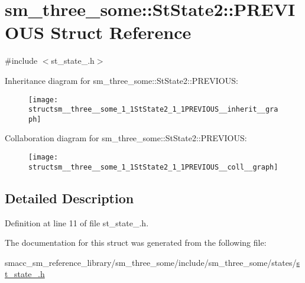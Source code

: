 \hypertarget{structsm__three__some_1_1StState2_1_1PREVIOUS}{}\section{sm\+\_\+three\+\_\+some\+:\+:St\+State2\+:\+:P\+R\+E\+V\+I\+O\+US Struct Reference}
\label{structsm__three__some_1_1StState2_1_1PREVIOUS}


{\ttfamily \#include $<$st\+\_\+state\+\_.\+h$>$}



Inheritance diagram for sm\+\_\+three\+\_\+some\+:\+:St\+State2\+:\+:P\+R\+E\+V\+I\+O\+US\+:
\nopagebreak
\begin{figure}[H]
\begin{center}
\leavevmode
\texttt{[image: structsm\_\_three\_\_some\_1\_1StState2\_1\_1PREVIOUS\_\_inherit\_\_graph]}
\end{center}
\end{figure}


Collaboration diagram for sm\+\_\+three\+\_\+some\+:\+:St\+State2\+:\+:P\+R\+E\+V\+I\+O\+US\+:
\nopagebreak
\begin{figure}[H]
\begin{center}
\leavevmode
\texttt{[image: structsm\_\_three\_\_some\_1\_1StState2\_1\_1PREVIOUS\_\_coll\_\_graph]}
\end{center}
\end{figure}


\subsection{Detailed Description}


Definition at line 11 of file st\+\_\+state\+\_.\+h.



The documentation for this struct was generated from the following file\+:\begin{DoxyCompactItemize}
\item 
smacc\+\_\+sm\+\_\+reference\+\_\+library/sm\+\_\+three\+\_\+some/include/sm\+\_\+three\+\_\+some/states/\hyperlink{sm__three__some_2include_2sm__three__some_2states_2st__state__2_8h}{st\+\_\+state\+\_.\+h}\end{DoxyCompactItemize}
